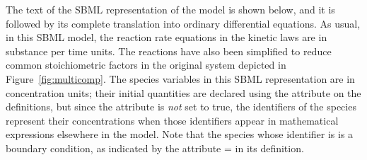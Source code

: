 The text of the SBML representation of the model is shown below,
and it is followed by its complete translation into ordinary
differential equations.  As usual, in this SBML model, the
reaction rate equations in the kinetic laws are in substance per
time units.  The reactions have also been simplified to reduce
common stoichiometric factors in the original system depicted in
Figure~\vref{fig:multicomp}.  The species variables in this SBML
representation are in concentration units; their initial
quantities are declared using the attribute 
on the  definitions, but since the attribute
 is \emph{not} set to true, the
identifiers of the species represent their concentrations when
those identifiers appear in mathematical expressions elsewhere in
the model.  Note that the species whose identifier is  is a
boundary condition, as indicated by the attribute
= in its definition.



